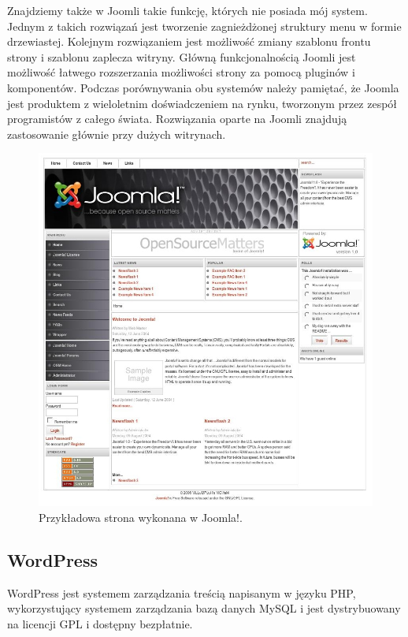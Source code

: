 \documentclass[openright]{xmgr}
\begin{document}
Znajdziemy także w Joomli takie funkcję, których nie posiada mój system. Jednym z takich rozwiązań jest tworzenie zagnieżdżonej struktury menu w formie drzewiastej. Kolejnym rozwiązaniem jest możliwość zmiany szablonu frontu strony i szablonu zaplecza witryny. Główną funkcjonalnością Joomli jest możliwość łatwego rozszerzania możliwości strony za pomocą pluginów i komponentów. Podczas porównywania obu systemów należy pamiętać, że Joomla jest produktem z wieloletnim doświadczeniem na rynku, tworzonym przez zespół programistów z całego świata. Rozwiązania oparte na Joomli znajdują zastosowanie głównie przy dużych witrynach.

\newpage

\begin{figure}[!tbh]
\centering
\includegraphics[width=\linewidth]{fig/joomla}
\caption{Przykładowa strona wykonana w Joomla!.}
\end{figure}

\subsection{WordPress}

WordPress jest systemem zarządzania treścią napisanym w języku PHP, wykorzystujący systemem zarządzania bazą danych MySQL i jest dystrybuowany na licencji GPL i dostępny bezpłatnie. 
\end{document}
